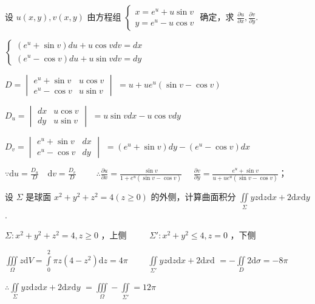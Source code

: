 \begin{problem}[points = 6]
设 $u(x, y), v(x, y)$ 由方程组 $
    \begin{cases}
        x = e^u + u\sin{v} \\
        y = e^u - u\cos{v}
    \end{cases}$
确定，求 $\frac{\partial u}{\partial x}, \frac{\partial v}{\partial y}$.
\end{problem}
\begin{solution}
    $\begin{cases}
            (e^u + \sin{v})du + u\cos{v}dv = dx \\
            (e^u - \cos{v})du + u\sin{v}dv = dy
        \end{cases}$

    $D = \begin{vmatrix}
            e^u + \sin{v} & u\cos{v} \\
            e^u - \cos{v} & u\sin{v}
        \end{vmatrix}$
    $ = u + ue^u(\sin{v} - \cos{v})$

    $D_u = \begin{vmatrix}
            dx & u\cos{v} \\
            dy & u\sin{v}
        \end{vmatrix}$
    $ = u\sin{v}dx - u\cos{v}dy$

    $D_v = \begin{vmatrix}
            e^u + \sin{v} & dx \\
            e^u - \cos{v} & dy
        \end{vmatrix}$
    $ = (e^u + \sin{v})dy - (e^u - \cos{v})dx$

    $\because \mathrm{d}u = \frac{D_u}{D} \quad \mathrm{d}v = \frac{D_v}{D} \qquad$
    $\therefore \frac{\partial u}{\partial x} = \frac{\sin{v}}{1 + e^u(\sin{v} - \cos{v})} \quad$
    $\frac{\partial v}{\partial y} = \frac{e^u + \sin{v}}{u + ue^u(\sin{v} - \cos{v})}$；
\end{solution}

\begin{problem}[points = 7]
设 $\Sigma$ 是球面 $x^2 + y^2 + z^2 = 4 (z \geq 0)$ 的外侧，计算曲面积分
$\iint\limits_{\Sigma} yz\mathrm{d}z\mathrm{d}x + 2 \mathrm{d}x\mathrm{d}y$.
\end{problem}
\begin{solution}
    $\Sigma: x^2 + y^2 + z^2 = 4 , z \geq 0$ ，上侧 $\qquad$
    $\Sigma': x^2 + y^2 \leq 4, z = 0$ ，下侧

    $\iiint\limits_{\Omega} z\mathrm{d}V = \int\limits_{0}^{2} \pi z(4 - z^2)\mathrm{d}z = 4\pi \qquad$
    $\iint\limits_{\Sigma'} yz\mathrm{d}z\mathrm{d}x + 2 \mathrm{d}x\mathrm{d}$
    $= -\iint\limits_{D} 2\mathrm{d}\sigma = -8\pi$

    $\therefore \iint\limits_{\Sigma} yz\mathrm{d}z\mathrm{d}x + 2 \mathrm{d}x\mathrm{d}y$
    $= \iiint\limits_{\Omega} - \iint\limits_{\Sigma'} = 12\pi$
\end{solution}

